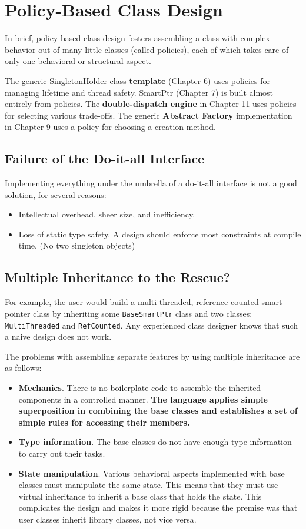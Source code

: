 \section{Policy-Based Class Design}

In brief, policy-based class design
fosters assembling a class with complex behavior out of many little classes 
(called policies), each of which
takes care of only one behavioral or structural aspect.

The generic SingletonHolder class \textbf{template} (Chapter
6) uses policies for managing lifetime and thread safety. {SmartPtr} (Chapter 7) 
is built almost entirely from policies. The \textbf{double-dispatch engine} in Chapter 11 
uses policies for selecting various trade-offs. The
generic \textbf{Abstract Factory} implementation in Chapter 9 uses a policy for choosing a
creation method.

\subsection{Failure of the Do-it-all Interface}

Implementing everything under the umbrella of a do-it-all interface is not a good solution, for several
reasons:

\begin{itemize}
    \item Intellectual overhead, sheer size, and inefficiency.
    \item Loss of static type safety. A design should enforce most constraints at compile time. (No two singleton objects)
\end{itemize}

\subsection{Multiple Inheritance to the Rescue?}
For example, the user would build a multi-threaded, reference-counted smart pointer
class by inheriting some 
\texttt{BaseSmartPtr} class and two classes: \texttt{MultiThreaded}
and  \texttt{RefCounted}. Any experienced class 
designer knows that such a naive design does not work.

The problems with assembling separate features by using
multiple inheritance are as follows:
\begin{itemize}
\item \textbf{Mechanics}. There is no boilerplate code to assemble the
  inherited components in a controlled manner. \textbf{The language applies
  simple superposition in combining the base classes and establishes a
  set of simple rules for accessing their members.  }
\item \textbf{Type information}. The base classes do not have enough type
  information to carry out their tasks. 
\item \textbf{State manipulation}. Various behavioral aspects implemented with
  base classes must manipulate the same state. This means that they
  must use virtual inheritance to inherit a base class that holds the
  state. This complicates the design and makes it more rigid because
  the premise was that user classes inherit library classes, not vice versa.
\end{itemize}

